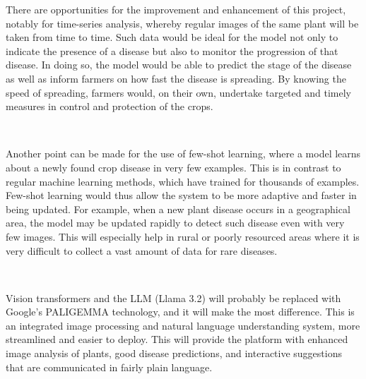 There are opportunities for the improvement and enhancement of this project, notably for time-series analysis, whereby regular images of the same plant will be taken from time to time. Such data would be ideal for the model not only to indicate the presence of a disease but also to monitor the progression of that disease. In doing so, the model would be able to predict the stage of the disease as well as inform farmers on how fast the disease is spreading. By knowing the speed of spreading, farmers would, on their own, undertake targeted and timely measures in control and protection of the crops. 

\

Another point can be made for the use of few-shot learning, where a model learns about a newly found crop disease in very few examples. This is in contrast to regular machine learning methods, which have trained for thousands of examples. Few-shot learning would thus allow the system to be more adaptive and faster in being updated. For example, when a new plant disease occurs in a geographical area, the model may be updated rapidly to detect such disease even with very few images. This will especially help in rural or poorly resourced areas where it is very difficult to collect a vast amount of data for rare diseases. 

\

Vision transformers and the LLM (Llama 3.2) will probably be replaced with Google's PALIGEMMA technology, and it will make the most difference. This is an integrated image processing and natural language understanding system, more streamlined and easier to deploy. This will provide the platform with enhanced image analysis of plants, good disease predictions, and interactive suggestions that are communicated in fairly plain language.